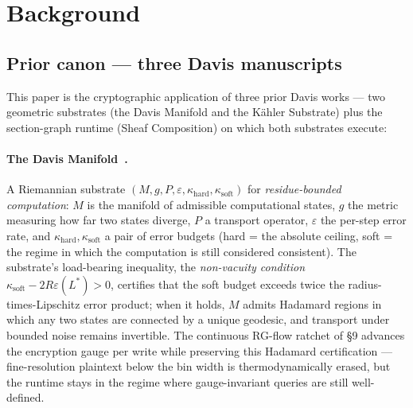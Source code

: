 \documentclass[11pt,letterpaper]{article}
\begin{document}
\section{Background}
\label{sec:background}

\subsection{Prior canon --- three Davis manuscripts}
\label{sec:background:canon}

This paper is the cryptographic application of three prior
Davis works --- two geometric substrates (the Davis Manifold and
the K\"ahler Substrate) plus the section-graph runtime
(Sheaf Composition) on which both substrates execute:

\paragraph{The Davis Manifold~\cite{davis2026manifold}.}
A Riemannian substrate $(M, g, P, \varepsilon, \kappa_{\text{hard}},
\kappa_{\text{soft}})$ for \emph{residue-bounded computation}:
$M$ is the manifold of admissible computational states, $g$ the
metric measuring how far two states diverge, $P$ a transport
operator, $\varepsilon$ the per-step error rate, and
$\kappa_{\text{hard}}, \kappa_{\text{soft}}$ a pair of error
budgets (hard = the absolute ceiling, soft = the regime in which
the computation is still considered consistent). The substrate's
load-bearing inequality, the \emph{non-vacuity condition}
$\kappa_{\text{soft}} - 2R\varepsilon(L^*) > 0$, certifies that
the soft budget exceeds twice the radius-times-Lipschitz error
product; when it holds, $M$ admits Hadamard regions in which any
two states are connected by a unique geodesic, and transport
under bounded noise remains invertible. The continuous RG-flow
ratchet of \S 9 advances the encryption gauge per write while
preserving this Hadamard certification --- fine-resolution
plaintext below the bin width is thermodynamically erased, but
the runtime stays in the regime where gauge-invariant queries are
still well-defined.
\end{document}

